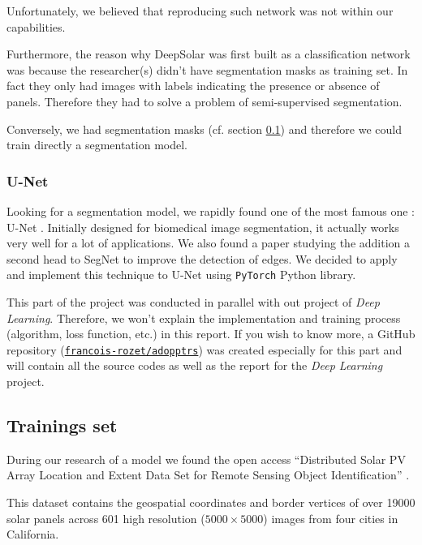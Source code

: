 \documentclass[a4paper, 12pt]{article}
\begin{document}
Unfortunately, we believed that reproducing such network was not within our capabilities.

Furthermore, the reason why DeepSolar was first built as a classification network was because the researcher(s) didn't have segmentation masks as training set. In fact they only had images with labels indicating the presence or absence of panels. Therefore they had to solve a problem of semi-supervised segmentation.

Conversely, we had segmentation masks (cf. section \ref{sec:training_set}) and therefore we could train directly a segmentation model.

\subsubsection{U-Net}

Looking for a segmentation model, we rapidly found one of the most famous one : U-Net \parencite{ronneberger2015u}. Initially designed for biomedical image segmentation, it actually works very well for a lot of applications. We also found a paper \parencite{bischke2019multi} studying the addition a second head to SegNet \parencite{badrinarayanan2017segnet} to improve the detection of edges. We decided to apply and implement this technique to U-Net using \texttt{PyTorch} Python library.

\begin{note}
This part of the project was conducted in parallel with out project of \emph{Deep Learning}. Therefore, we won't explain the implementation and training process (algorithm, loss function, etc.) in this report. If you wish to know more, a GitHub repository (\href{https://github.com/francois-rozet/adopptrs}{\texttt{francois-rozet/adopptrs}}) was created especially for this part and will contain all the source codes as well as the report for the \emph{Deep Learning} project.
\end{note}

\subsection{Trainings set} \label{sec:training_set}

During our research of a model we found the open access \enquote{Distributed Solar PV Array Location and Extent Data Set for Remote Sensing Object Identification} \parencite{bradbury2016distributed}.

This dataset contains the geospatial coordinates and border vertices of over \num{19000} solar panels across \num{601} high resolution ($5000 \times 5000$) images from four cities in California.
\end{document}
